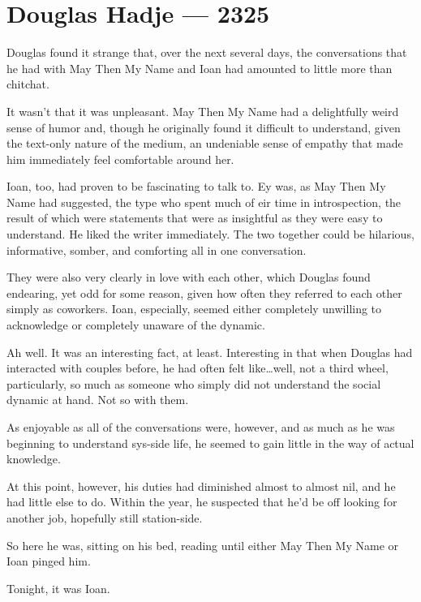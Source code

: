 \hypertarget{douglas-hadje-2325}{%
\chapter{Douglas Hadje — 2325}\label{douglas-hadje-2325}}

Douglas found it strange that, over the next several days, the conversations that he had with May Then My Name and Ioan had amounted to little more than chitchat.

It wasn't that it was unpleasant. May Then My Name had a delightfully weird sense of humor and, though he originally found it difficult to understand, given the text-only nature of the medium, an undeniable sense of empathy that made him immediately feel comfortable around her.

Ioan, too, had proven to be fascinating to talk to. Ey was, as May Then My Name had suggested, the type who spent much of eir time in introspection, the result of which were statements that were as insightful as they were easy to understand. He liked the writer immediately. The two together could be hilarious, informative, somber, and comforting all in one conversation.

They were also very clearly in love with each other, which Douglas found endearing, yet odd for some reason, given how often they referred to each other simply as coworkers. Ioan, especially, seemed either completely unwilling to acknowledge or completely unaware of the dynamic.

Ah well. It was an interesting fact, at least. Interesting in that when Douglas had interacted with couples before, he had often felt like\ldots well, not a third wheel, particularly, so much as someone who simply did not understand the social dynamic at hand. Not so with them.

As enjoyable as all of the conversations were, however, and as much as he was beginning to understand sys-side life, he seemed to gain little in the way of actual knowledge.

At this point, however, his duties had diminished almost to almost nil, and he had little else to do. Within the year, he suspected that he'd be off looking for another job, hopefully still station-side.

So here he was, sitting on his bed, reading until either May Then My Name or Ioan pinged him.

Tonight, it was Ioan.

